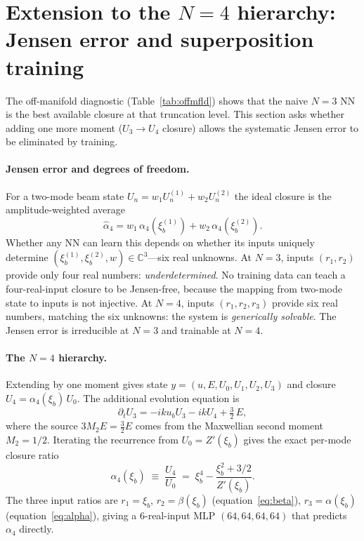 \documentclass[11pt]{article}
\newcommand{\xib}{\xi_b}
\newcommand{\ub}{u_b}
\begin{document}
\section{Extension to the $N=4$ hierarchy: Jensen error and superposition training}
\label{sec:n4}

The off-manifold diagnostic (Table~\ref{tab:offmfld}) shows that the naive
$N=3$ NN is the best available closure at that truncation level.  This section
asks whether adding one more moment ($U_3 \to U_4$ closure) allows the
systematic Jensen error to be eliminated by training.

\paragraph{Jensen error and degrees of freedom.}
For a two-mode beam state
$U_n = w_1 U_n^{(1)} + w_2 U_n^{(2)}$ the ideal closure is the
amplitude-weighted average
\begin{equation}
  \hat\alpha_4 = w_1\,\alpha_4(\xib^{(1)}) + w_2\,\alpha_4(\xib^{(2)}).
\end{equation}
Whether any NN can learn this depends on whether its inputs uniquely determine
$(\xib^{(1)},\xib^{(2)},w)\in\mathbb{C}^3$---six real unknowns.
At $N=3$, inputs $(r_1, r_2)$ provide only four real numbers:
\emph{underdetermined}.  No training data can teach a four-real-input closure
to be Jensen-free, because the mapping from two-mode state to inputs is not
injective.  At $N=4$, inputs $(r_1, r_2, r_3)$ provide six real numbers,
matching the six unknowns: the system is \emph{generically solvable}.  The
Jensen error is irreducible at $N=3$ and trainable at $N=4$.

\paragraph{The $N=4$ hierarchy.}
Extending by one moment gives state $y=(u,E,U_0,U_1,U_2,U_3)$ and closure
$U_4 = \alpha_4(\xib)\,U_0$.  The additional evolution equation is
\begin{equation}
  \partial_t U_3 = -ik\ub U_3 - ik U_4 + \tfrac{3}{2}\,E,
\end{equation}
where the source $3M_2 E = \tfrac{3}{2}E$ comes from the Maxwellian second
moment $M_2 = 1/2$.  Iterating the recurrence from $U_0 = Z'(\xib)$ gives the
exact per-mode closure ratio
\begin{equation}\label{eq:alpha4}
  \alpha_4(\xib) \;\equiv\; \frac{U_4}{U_0}
  \;=\; \xib^4 - \frac{\xib^2 + 3/2}{Z'(\xib)}.
\end{equation}
The three input ratios are $r_1 = \xib$, $r_2 = \beta(\xib)$
(equation~\ref{eq:beta}), $r_3 = \alpha(\xib)$ (equation~\ref{eq:alpha}),
giving a 6-real-input MLP $(64,64,64,64)$ that predicts $\alpha_4$ directly.
\end{document}
